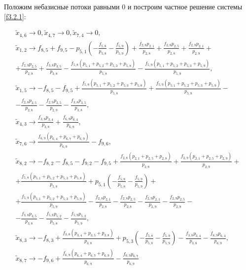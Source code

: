\documentclass[14pt]{extarticle}%
\begin{document}
Положим небазисные потоки равными 0 и построим частное решение системы \eqref{f3.2.1}:

\begin{equation*}
\begin{gathered}
\tilde{x}_{4,6}\to 0, \tilde{x}_{4,7}\to 0, \tilde{x}_{7,4}\to 0,\\
\tilde{x}_{1,2}\to f_{8,5}+f_{9,5}-p_{5,1} \left(-\frac{f_{5,8}}{p_{5,8}}-\frac{f_{5,9}}{p_{5,9}}\right)+\frac{f_{2,8} p_{2,1}}{p_{2,8}}+\frac{f_{2,8} p_{2,5}}{p_{2,8}}+\frac{f_{2,9} p_{2,1}}{p_{2,9}}+\\
+\frac{f_{2,9} p_{2,5}}{p_{2,9}}+\frac{f_{3,8} p_{3,5}}{p_{3,8}}-\frac{f_{5,8} \left(p_{5,1}+p_{5,2}+p_{5,3}+p_{5,8}\right)}{p_{5,8}}-\frac{f_{5,9} \left(p_{5,1}+p_{5,2}+p_{5,3}+p_{5,9}\right)}{p_{5,9}},\\
\tilde{x}_{1,5}\to -f_{8,5}-f_{9,5}+\frac{f_{5,8} \left(p_{5,1}+p_{5,2}+p_{5,3}+p_{5,8}\right)}{p_{5,8}}+\frac{f_{5,9} \left(p_{5,1}+p_{5,2}+p_{5,3}+p_{5,9}\right)}{p_{5,9}}-\\-\frac{f_{2,8} p_{2,5}}{p_{2,8}}-\frac{f_{2,9} p_{2,5}}{p_{2,9}}-\frac{f_{3,8} p_{3,5}}{p_{3,8}},\\
\tilde{x}_{4,3}\to \frac{f_{3,8} p_{3,4}}{p_{3,8}}+\frac{f_{6,9} p_{6,4}}{p_{6,9}},\\
\tilde{x}_{7,6}\to \frac{f_{6,9} \left(p_{6,4}+p_{6,7}+p_{6,9}\right)}{p_{6,9}}-f_{9,6},\\
\tilde{x}_{8,2}\to -f_{8,2}-f_{8,5}-f_{9,2}-f_{9,5}+\frac{f_{2,8} \left(p_{2,1}+p_{2,5}+p_{2,8}\right)}{p_{2,8}}+\frac{f_{2,9} \left(p_{2,1}+p_{2,5}+p_{2,9}\right)}{p_{2,9}}+\\
+\frac{f_{5,8} \left(p_{5,1}+p_{5,2}+p_{5,3}+p_{5,8}\right)}{p_{5,8}}+p_{5,1} \left(-\frac{f_{5,8}}{p_{5,8}}-\frac{f_{5,9}}{p_{5,9}}\right)+\\
+\frac{f_{5,9} \left(p_{5,1}+p_{5,2}+p_{5,3}+p_{5,9}\right)}{p_{5,9}}-\frac{f_{2,8} p_{2,1}}{p_{2,8}}-\frac{f_{2,8} p_{2,5}}{p_{2,8}}-\frac{f_{2,9} p_{2,1}}{p_{2,9}}-\frac{f_{2,9} p_{2,5}}{p_{2,9}}-\\-\frac{f_{3,8} p_{3,5}}{p_{3,8}}-\frac{f_{5,8} p_{5,2}}{p_{5,8}}-\frac{f_{5,9} p_{5,2}}{p_{5,9}},\\
\tilde{x}_{8,3}\to -f_{8,3}+\frac{f_{3,8} \left(p_{3,4}+p_{3,5}+p_{3,8}\right)}{p_{3,8}}+p_{5,3} \left(-\frac{f_{5,8}}{p_{5,8}}-\frac{f_{5,9}}{p_{5,9}}\right)-\frac{f_{3,8} p_{3,4}}{p_{3,8}}-\frac{f_{6,9} p_{6,4}}{p_{6,9}},\\
\tilde{x}_{8,7}\to -f_{9,6}+\frac{f_{6,9} \left(p_{6,4}+p_{6,7}+p_{6,9}\right)}{p_{6,9}}-\frac{f_{6,9} p_{6,7}}{p_{6,9}}
\end{gathered}
\end{equation*}
\end{document}
